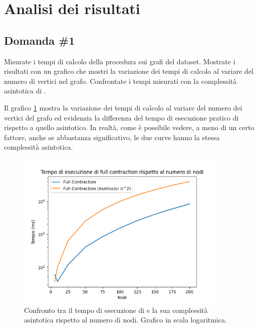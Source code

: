 \section{Analisi dei risultati}
\label{cap:performance-analysis}

\subsection{Domanda \#1}
\label{sec:question-1}

\begin{displayquote}
Misurate i tempi di calcolo della procedura
 sui grafi del dataset. Mostrate i
risultati con un grafico che mostri la variazione dei tempi di calcolo
al variare del numero di vertici nel grafo. Confrontate i tempi
misurati con la complessità asintotica di
.
\end{displayquote}

\noindent Il grafico \ref{fig:karger-full-contraction-chart} mostra la
variazione dei tempi di calcolo al variare del numero dei vertici del
grafo ed evidenzia la differenza del tempo di esecuzione pratico di
 rispetto a quello asintotico. In
realtà, come è possibile vedere, a meno di un certo fattore, anche se
abbastanza significativo, le due curve hanno la stessa complessità
asintotica.

\begin{figure}[H]
    \centering

    \includegraphics[width=0.9\textwidth]{./images/Tempo_di_esecuzione_di_full_contraction_rispetto_al_numero_di_nodi.png}

    \caption{Confronto tra il tempo di esecuzione di  e la sua complessità asintotica rispetto al numero di nodi. Grafico in scala logaritmica.}
    \label{fig:karger-full-contraction-chart}
\end{figure}

